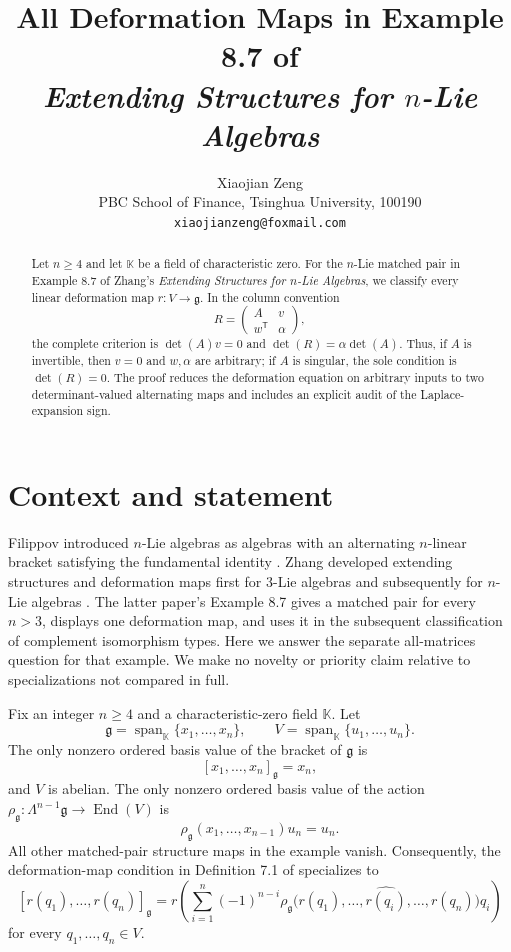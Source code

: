 \documentclass[11pt]{article}
\title{All Deformation Maps in Example 8.7 of\\
\emph{Extending Structures for $n$-Lie Algebras}}
\author{Xiaojian Zeng\\
PBC School of Finance, Tsinghua University, 100190\\
\texttt{xiaojianzeng@foxmail.com}}
\date{}
\newcommand{\K}{\mathbb K}
\begin{document}
\maketitle

\begin{abstract}
Let $n\geq4$ and let $\K$ be a field of characteristic zero.  For the
$n$-Lie matched pair in Example 8.7 of Zhang's \emph{Extending Structures
for $n$-Lie Algebras}, we classify every linear deformation map
$r\colon V\to\mathfrak g$.  In the column convention
\[
R=\begin{pmatrix}A&v\\ w^{\mathsf T}&\alpha\end{pmatrix},
\]
the complete criterion is
$\det(A)v=0$ and $\det(R)=\alpha\det(A)$.  Thus, if $A$ is invertible,
then $v=0$ and $w,\alpha$ are arbitrary; if $A$ is singular, the sole
condition is $\det(R)=0$.  The proof reduces the deformation equation on
arbitrary inputs to two determinant-valued alternating maps and includes an
explicit audit of the Laplace-expansion sign.
\end{abstract}

\section{Context and statement}

Filippov introduced $n$-Lie algebras as algebras with an alternating
$n$-linear bracket satisfying the fundamental identity
\cite{Filippov1985}.  Zhang developed extending structures and deformation
maps first for $3$-Lie algebras \cite{Zhang2022} and subsequently for
$n$-Lie algebras \cite{Zhang2026}.  The latter paper's Example 8.7 gives a
matched pair for every $n>3$, displays one deformation map, and uses it in
the subsequent classification of complement isomorphism types.  Here we
answer the separate all-matrices question for that example.  We make no
novelty or priority claim relative to specializations not compared in full.

Fix an integer $n\geq4$ and a characteristic-zero field $\K$.  Let
\[
 \mathfrak g=\operatorname{span}_{\K}\{x_1,\ldots,x_n\},\qquad
 V=\operatorname{span}_{\K}\{u_1,\ldots,u_n\}.
\]
The only nonzero ordered basis value of the bracket of $\mathfrak g$ is
\[
 [x_1,\ldots,x_n]_{\mathfrak g}=x_n,
\]
and $V$ is abelian.  The only nonzero ordered basis value of the action
$\rho_{\mathfrak g}\colon\Lambda^{n-1}\mathfrak g\to
\operatorname{End}(V)$ is
\[
 \rho_{\mathfrak g}(x_1,\ldots,x_{n-1})u_n=u_n.
\]
All other matched-pair structure maps in the example vanish.  Consequently,
the deformation-map condition in Definition 7.1 of \cite{Zhang2026}
specializes to
\begin{equation}\label{eq:DM}
 [r(q_1),\ldots,r(q_n)]_{\mathfrak g}
 =r\!\left(\sum_{i=1}^n(-1)^{n-i}
 \rho_{\mathfrak g}\bigl(r(q_1),\ldots,\widehat{r(q_i)},\ldots,
 r(q_n)\bigr)q_i\right)
\end{equation}
for every $q_1,\ldots,q_n\in V$.
\end{document}
